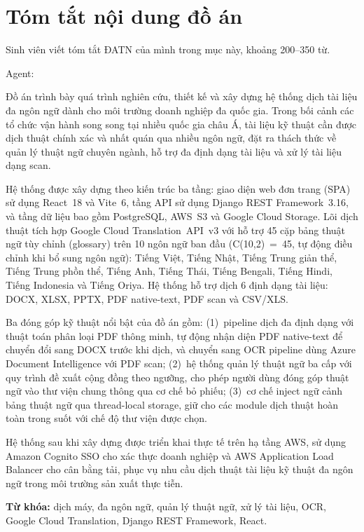 \chapter*{Tóm tắt nội dung đồ án}

Sinh viên viết tóm tắt ĐATN của mình trong mục này, khoảng 200--350 từ.

Agent:

Đồ án trình bày quá trình nghiên cứu, thiết kế và xây dựng hệ thống dịch tài liệu đa ngôn ngữ
dành cho môi trường doanh nghiệp đa quốc gia. Trong bối cảnh các tổ chức vận hành song song tại
nhiều quốc gia châu Á, tài liệu kỹ thuật cần được dịch thuật chính xác và nhất quán qua nhiều
ngôn ngữ, đặt ra thách thức về quản lý thuật ngữ chuyên ngành, hỗ trợ đa định dạng tài liệu và
xử lý tài liệu dạng scan.

Hệ thống được xây dựng theo kiến trúc ba tầng: giao diện web đơn trang (SPA) sử dụng React~18
và Vite~6, tầng API sử dụng Django REST Framework~3.16, và tầng dữ liệu bao gồm PostgreSQL,
AWS~S3 và Google Cloud Storage. Lõi dịch thuật tích hợp Google Cloud Translation~API~v3 với hỗ
trợ 45 cặp bảng thuật ngữ tùy chỉnh (glossary) trên 10 ngôn ngữ ban đầu (C(10,2)~=~45,
tự động điều chỉnh khi bổ sung ngôn ngữ): Tiếng Việt, Tiếng Nhật,
Tiếng Trung giản thể, Tiếng Trung phồn thể, Tiếng Anh, Tiếng Thái, Tiếng Bengali, Tiếng Hindi,
Tiếng Indonesia và Tiếng Oriya. Hệ thống hỗ trợ dịch 6 định dạng tài liệu: DOCX, XLSX, PPTX,
PDF native-text, PDF scan và CSV/XLS.

Ba đóng góp kỹ thuật nổi bật của đồ án gồm: (1)~pipeline dịch đa định dạng với thuật toán phân
loại PDF thông minh, tự động nhận diện PDF native-text để chuyển đổi sang DOCX trước khi dịch,
và chuyển sang OCR pipeline dùng Azure Document Intelligence với PDF scan;
(2)~hệ thống quản lý thuật ngữ ba cấp với quy trình đề xuất cộng đồng theo ngưỡng, cho phép
người dùng đóng góp thuật ngữ vào thư viện chung thông qua cơ chế bỏ phiếu;
(3)~cơ chế inject ngữ cảnh bảng thuật ngữ qua thread-local storage, giữ cho các module dịch
thuật hoàn toàn trong suốt với chế độ thư viện được chọn.

Hệ thống sau khi xây dựng được triển khai thực tế trên hạ tầng AWS, sử dụng Amazon Cognito
SSO cho xác thực doanh nghiệp và AWS Application Load Balancer cho cân bằng tải, phục vụ
nhu cầu dịch thuật tài liệu kỹ thuật đa ngôn ngữ trong môi trường sản xuất thực tiễn.

\bigskip
\noindent\textbf{Từ khóa:} dịch máy, đa ngôn ngữ, quản lý thuật ngữ, xử lý tài liệu, OCR,
Google Cloud Translation, Django REST Framework, React.

